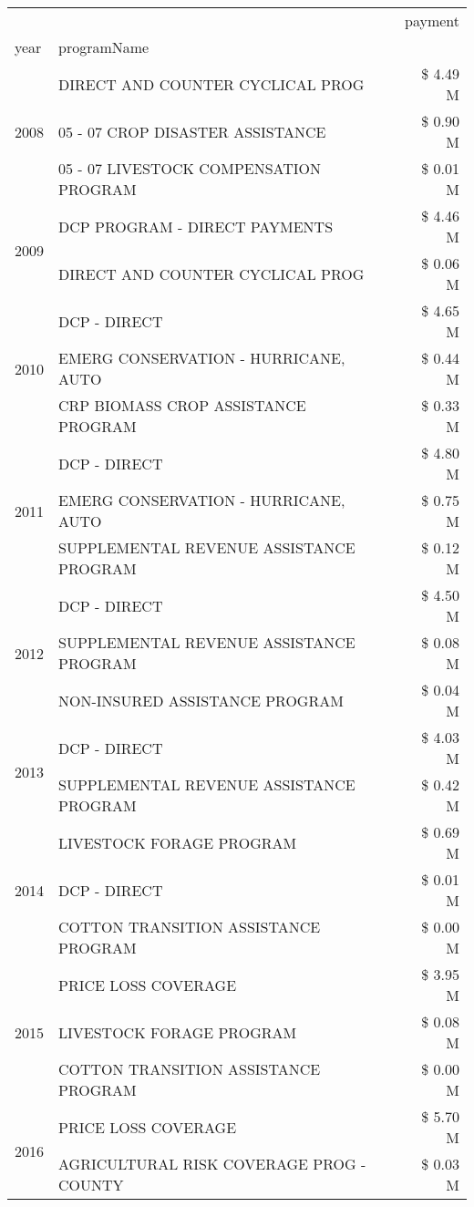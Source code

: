 \begin{tabular}{llr}
\toprule
 &  & payment \\
year & programName &  \\
\midrule
\multirow[t]{3}{*}{2008} & DIRECT AND COUNTER CYCLICAL PROG & \$ 4.49 M \\
 & 05 - 07 CROP DISASTER ASSISTANCE & \$ 0.90 M \\
 & 05 - 07 LIVESTOCK COMPENSATION PROGRAM & \$ 0.01 M \\
\cline{1-3}
\multirow[t]{2}{*}{2009} & DCP PROGRAM - DIRECT PAYMENTS & \$ 4.46 M \\
 & DIRECT AND COUNTER CYCLICAL PROG & \$ 0.06 M \\
\cline{1-3}
\multirow[t]{3}{*}{2010} & DCP - DIRECT & \$ 4.65 M \\
 & EMERG CONSERVATION - HURRICANE, AUTO & \$ 0.44 M \\
 & CRP BIOMASS CROP ASSISTANCE PROGRAM & \$ 0.33 M \\
\cline{1-3}
\multirow[t]{3}{*}{2011} & DCP - DIRECT & \$ 4.80 M \\
 & EMERG CONSERVATION - HURRICANE, AUTO & \$ 0.75 M \\
 & SUPPLEMENTAL REVENUE ASSISTANCE PROGRAM & \$ 0.12 M \\
\cline{1-3}
\multirow[t]{3}{*}{2012} & DCP - DIRECT & \$ 4.50 M \\
 & SUPPLEMENTAL REVENUE ASSISTANCE PROGRAM & \$ 0.08 M \\
 & NON-INSURED ASSISTANCE PROGRAM & \$ 0.04 M \\
\cline{1-3}
\multirow[t]{2}{*}{2013} & DCP - DIRECT & \$ 4.03 M \\
 & SUPPLEMENTAL REVENUE ASSISTANCE PROGRAM & \$ 0.42 M \\
\cline{1-3}
\multirow[t]{3}{*}{2014} & LIVESTOCK FORAGE PROGRAM & \$ 0.69 M \\
 & DCP - DIRECT & \$ 0.01 M \\
 & COTTON TRANSITION ASSISTANCE PROGRAM & \$ 0.00 M \\
\cline{1-3}
\multirow[t]{3}{*}{2015} & PRICE LOSS COVERAGE & \$ 3.95 M \\
 & LIVESTOCK FORAGE PROGRAM & \$ 0.08 M \\
 & COTTON TRANSITION ASSISTANCE PROGRAM & \$ 0.00 M \\
\cline{1-3}
\multirow[t]{3}{*}{2016} & PRICE LOSS COVERAGE & \$ 5.70 M \\
 & AGRICULTURAL RISK COVERAGE PROG - COUNTY & \$ 0.03 M \\

\end{tabular}
